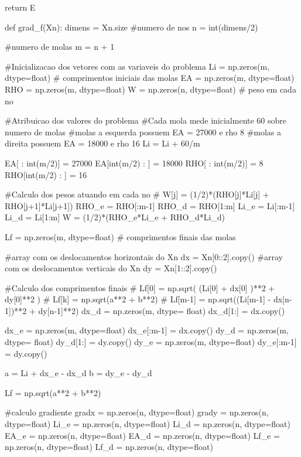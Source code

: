 \documentclass[10pt, a4paper]{article}
\begin{document}
\begin{python}
    return E

  def grad_f(Xn):
      dimens = Xn.size
      #numero de nos
      n = int(dimens/2)

      #numero de molas
      m = n + 1

      #Inicializacao dos vetores com as variaveis do problema
      Li = np.zeros(m, dtype=float) # comprimentos iniciais das molas
      EA = np.zeros(m, dtype=float)
      RHO = np.zeros(m, dtype=float)
      W = np.zeros(n, dtype=float) # peso em cada no
      
      #Atribuicao dos valores do problema
      #Cada mola mede inicialmente 60 sobre numero de molas
      #molas a esquerda possuem EA = 27000 e rho 8
      #molas a direita possuem EA = 18000 e rho 16
      Li = Li + 60/m

      EA[ : int(m/2)] = 27000
      EA[int(m/2) : ] = 18000
      RHO[ : int(m/2)] = 8
      RHO[int(m/2) : ] = 16
      
      #Calculo dos pesos atuando em cada no
      # W[j] = (1/2)*(RHO[j]*Li[j] + RHO[j+1]*Li[j+1])
      RHO_e = RHO[:m-1]
      RHO_d = RHO[1:m]
      Li_e = Li[:m-1]
      Li_d = Li[1:m]
      W = (1/2)*(RHO_e*Li_e + RHO_d*Li_d)

      Lf = np.zeros(m, dtype=float) # comprimentos finais das molas
          
      #array com os deslocamentos horizontais do Xn
      dx = Xn[0::2].copy()
      #array com os deslocamentos verticais do Xn
      dy = Xn[1::2].copy()
      
      #Calculo dos comprimentos finais
      # Lf[0] = np.sqrt( (Li[0] + dx[0] )**2 + dy[0]**2 ) 
      # Lf[k] = np.sqrt(a**2 + b**2)
      # Lf[m-1] = np.sqrt((Li[m-1] - dx[n-1])**2 + dy[n-1]**2)
      dx_d = np.zeros(m, dtype= float)
      dx_d[1:] = dx.copy()
      
      dx_e = np.zeros(m, dtype=float)
      dx_e[:m-1] = dx.copy()
      dy_d = np.zeros(m, dtype= float)
      dy_d[1:] = dy.copy()
      dy_e = np.zeros(m, dtype=float)
      dy_e[:m-1] = dy.copy()
      
      a = Li + dx_e - dx_d
      b = dy_e - dy_d
      
      Lf = np.sqrt(a**2 + b**2)
      
      #calculo gradiente
      gradx = np.zeros(n, dtype=float)
      grady = np.zeros(n, dtype=float)
      Li_e = np.zeros(n, dtype=float)
      Li_d = np.zeros(n, dtype=float)
      EA_e = np.zeros(n, dtype=float)
      EA_d = np.zeros(n, dtype=float)
      Lf_e = np.zeros(n, dtype=float)
      Lf_d = np.zeros(n, dtype=float)
      

\end{python}
\end{document}
